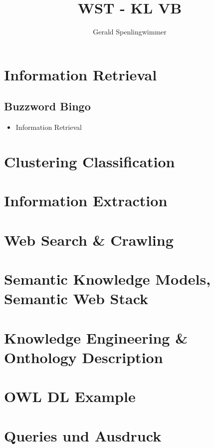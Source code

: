 \documentclass[12pt]{article}
\title{WST - KL VB}
\author{Gerald Spenlingwimmer}
\begin{document}
	\maketitle\newpage
	\tableofcontents\newpage
    
    \section{Information Retrieval}
        \subsection{Buzzword Bingo}
        \begin{itemize}
            \item Information Retrieval
            
        \end{itemize}
        

    \section{Clustering Classification}

    \section{Information Extraction}

    \section{Web Search \& Crawling}

    \section{Semantic Knowledge Models, Semantic Web Stack}

    \section{Knowledge Engineering \& Onthology Description}

    \section{OWL DL Example}

    \section{Queries und Ausdruck}
\end{document}

